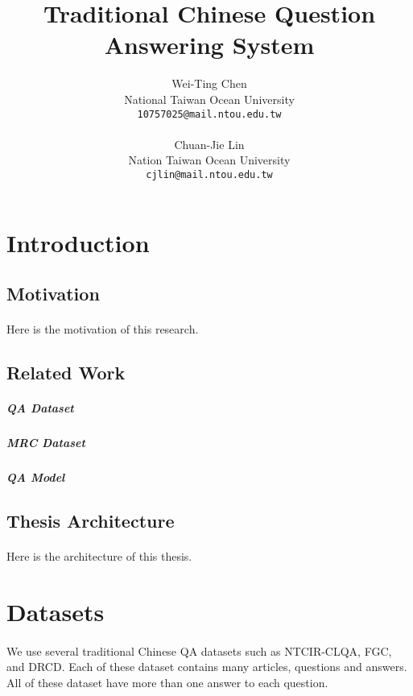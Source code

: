 \documentclass{article}
\title{Traditional Chinese Question Answering System}
\author{
  Wei-Ting Chen\\
  National Taiwan Ocean University\\
  \texttt{10757025@mail.ntou.edu.tw}\\
  \\
  Chuan-Jie Lin\\
  Nation Taiwan Ocean University\\
  \texttt{cjlin@mail.ntou.edu.tw}\\
}
\begin{document}
\maketitle
{}

\newpage

\doublespacing
\tableofcontents
\singlespacing

\newpage

\section{Introduction}

\subsection{Motivation}
\paragraph{}
Here is the motivation of this research.

\subsection{Related Work}
\paragraph{}

\subparagraph{QA Dataset}

\subparagraph{MRC Dataset}

\subparagraph{QA Model}

\subsection{Thesis Architecture}
\paragraph{}
Here is the architecture of this thesis.

\section{Datasets}
\paragraph{}
We use several traditional Chinese QA datasets such as NTCIR-CLQA, FGC, and DRCD. Each of these dataset contains many articles, questions and answers. All of these dataset have more than one answer to each question.
\end{document}
